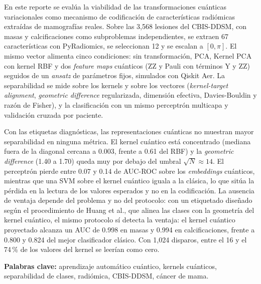 En este reporte se evalúa la viabilidad de las transformaciones cuánticas variacionales como mecanismo de codificación de características radiómicas extraídas de mamografías reales. Sobre las 3,568 lesiones del CBIS-DDSM, con masas y calcificaciones como subproblemas independientes, se extraen 67 características con PyRadiomics, se seleccionan 12 y se escalan a $[0,\pi]$. El mismo vector alimenta cinco condiciones: sin transformación, PCA, Kernel PCA con kernel RBF y dos \textit{feature maps} cuánticos (ZZ y Pauli con términos Y y ZZ) seguidos de un \textit{ansatz} de parámetros fijos, simulados con Qiskit Aer. La separabilidad se mide sobre los kernels y sobre los vectores (\textit{kernel-target alignment}, \textit{geometric difference} regularizada, dimensión efectiva, Davies-Bouldin y razón de Fisher), y la clasificación con un mismo perceptrón multicapa y validación cruzada por paciente.

Con las etiquetas diagnósticas, las representaciones cuánticas no muestran mayor separabilidad en ninguna métrica. El kernel cuántico está concentrado (mediana fuera de la diagonal cercana a 0.003, frente a 0.61 del RBF) y la \textit{geometric difference} (1.40 a 1.70) queda muy por debajo del umbral $\sqrt{N}\approx 14$. El perceptrón pierde entre 0.07 y 0.14 de AUC-ROC sobre los \textit{embeddings} cuánticos, mientras que una SVM sobre el kernel cuántico iguala a la clásica, lo que sitúa la pérdida en la lectura de los valores esperados y no en la codificación. La ausencia de ventaja depende del problema y no del protocolo: con un etiquetado diseñado según el procedimiento de Huang et al., que alinea las clases con la geometría del kernel cuántico, el mismo protocolo sí detecta la ventaja: el kernel cuántico proyectado alcanza un AUC de 0.998 en masas y 0.994 en calcificaciones, frente a 0.800 y 0.824 del mejor clasificador clásico. Con 1,024 disparos, entre el 16 y el 74\,\% de los valores del kernel se leerían como cero.

\noindent\textbf{Palabras clave:} aprendizaje automático cuántico, kernels cuánticos, separabilidad de clases, radiómica, CBIS-DDSM, cáncer de mama.
